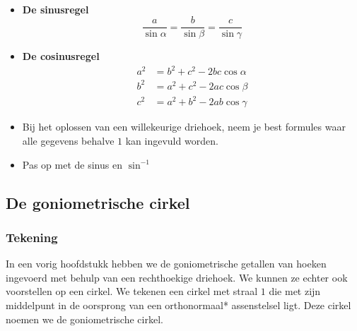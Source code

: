 \begin{onthoud}
	\ \\

\begin{itemize}
	\item \textbf{De sinusregel}
	\[\frac{a}{\sin \alpha}=\frac{b}{\sin \beta}=\frac{c}{\sin \gamma}\]
	\item \textbf{De cosinusregel}
	\begin{align*}
a^2&= b^2+c^2-2bc\cos \alpha\\
b^2&=a^2 + c^2 - 2ac\cos \beta\\
c^2&= a^2 + b^2 -2ab \cos \gamma
\end{align*}
\item Bij het oplossen van een willekeurige driehoek, neem je best formules waar alle gegevens behalve $1$ kan ingevuld worden.
\item Pas op met de sinus en $\sin^{-1}$
\end{itemize}

\begin{figure}[H]
	\centering 
	 
\end{figure}

\end{onthoud}

\subsection{De goniometrische cirkel}


\subsubsection{Tekening}

In een vorig hoofdstukk hebben we de goniometrische getallen van hoeken ingevoerd met behulp van een rechthoekige driehoek. We kunnen ze echter ook voorstellen op een cirkel. We tekenen een cirkel met straal $1$ die met zijn middelpunt in de oorsprong van een orthonormaal* assenstelsel ligt. Deze cirkel noemen we de goniometrische cirkel.

